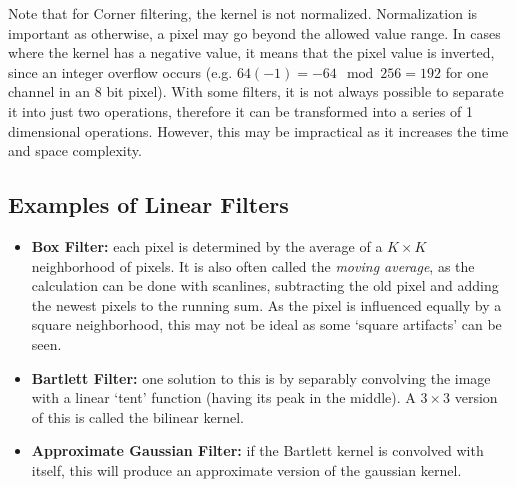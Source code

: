 \documentclass[twoside,a4paper,article]{combine}
\begin{document}
Note that for Corner filtering, the kernel is not normalized. Normalization is important as otherwise, a pixel may go beyond the allowed value range.
In cases where the kernel has a negative value, it means that the pixel value is inverted, since an integer overflow occurs (e.g. $64
(-1)= -64 \mod 256 = 192$ for one channel in an 8 bit pixel).
With some filters, it is not always possible to separate it into just two operations, therefore it can be
transformed into a series of 1 dimensional operations. However, this may be impractical as it increases the time and space
complexity.

\subsection{Examples of Linear Filters}
\begin{itemize}
    \item \textbf{Box Filter:} each pixel is determined by the average of a $K \times K$ 
        neighborhood of pixels. It is also often called the \emph{moving average}, as the calculation can be done with scanlines, subtracting the
        old pixel and adding the newest pixels to the running sum. As the pixel is influenced equally by a square neighborhood, this may not be ideal as some `square artifacts' can be seen.
    \item \textbf{Bartlett Filter:} one solution to this is by separably convolving the image
        with a linear `tent' function (having its peak in the middle). A $3\times 3$ version of this is called the bilinear kernel.
    \item \textbf{Approximate Gaussian Filter:} if the Bartlett kernel is convolved with itself, this will produce an approximate version of the gaussian kernel.
\end{itemize}
\end{document}
